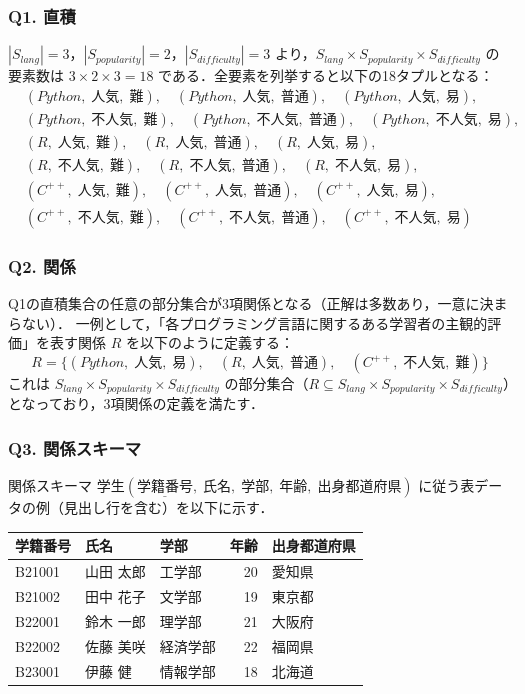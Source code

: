 \subsubsection*{Q1. 直積}
$|S_{lang}| = 3$，$|S_{popularity}| = 2$，$|S_{difficulty}| = 3$ より，$S_{lang} \times S_{popularity} \times S_{difficulty}$ の要素数は $3 \times 2 \times 3 = 18$ である．全要素を列挙すると以下の18タプルとなる：
\begin{align*}
&(Python,\; 人気,\; 難),\quad (Python,\; 人気,\; 普通),\quad (Python,\; 人気,\; 易), \\
&(Python,\; 不人気,\; 難),\quad (Python,\; 不人気,\; 普通),\quad (Python,\; 不人気,\; 易), \\
&(R,\; 人気,\; 難),\quad (R,\; 人気,\; 普通),\quad (R,\; 人気,\; 易), \\
&(R,\; 不人気,\; 難),\quad (R,\; 不人気,\; 普通),\quad (R,\; 不人気,\; 易), \\
&(C^{++},\; 人気,\; 難),\quad (C^{++},\; 人気,\; 普通),\quad (C^{++},\; 人気,\; 易), \\
&(C^{++},\; 不人気,\; 難),\quad (C^{++},\; 不人気,\; 普通),\quad (C^{++},\; 不人気,\; 易)
\end{align*}

\subsubsection*{Q2. 関係}
Q1の直積集合の任意の部分集合が3項関係となる（正解は多数あり，一意に決まらない）．
一例として，「各プログラミング言語に関するある学習者の主観的評価」を表す関係 $R$ を以下のように定義する：
\begin{equation*}
R = \{(Python,\; 人気,\; 易),\quad (R,\; 人気,\; 普通),\quad (C^{++},\; 不人気,\; 難)\}
\end{equation*}
これは $S_{lang} \times S_{popularity} \times S_{difficulty}$ の部分集合（$R \subseteq S_{lang} \times S_{popularity} \times S_{difficulty}$）となっており，3項関係の定義を満たす．

\subsubsection*{Q3. 関係スキーマ}
関係スキーマ $\textbf{学生}(\underline{学籍番号},\; 氏名,\; 学部,\; 年齢,\; 出身都道府県)$ に従う表データの例（見出し行を含む）を以下に示す．

\begin{table}[!htbp]
    \centering
    \begin{tabular}{lllrl}
    \toprule
    \textbf{学籍番号} & \textbf{氏名} & \textbf{学部} & \textbf{年齢} & \textbf{出身都道府県} \\ \midrule
    B21001 & 山田 太郎 & 工学部   & 20 & 愛知県 \\
    B21002 & 田中 花子 & 文学部   & 19 & 東京都 \\
    B22001 & 鈴木 一郎 & 理学部   & 21 & 大阪府 \\
    B22002 & 佐藤 美咲 & 経済学部 & 22 & 福岡県 \\
    B23001 & 伊藤 健   & 情報学部 & 18 & 北海道 \\ \bottomrule
    \end{tabular}
\end{table}

